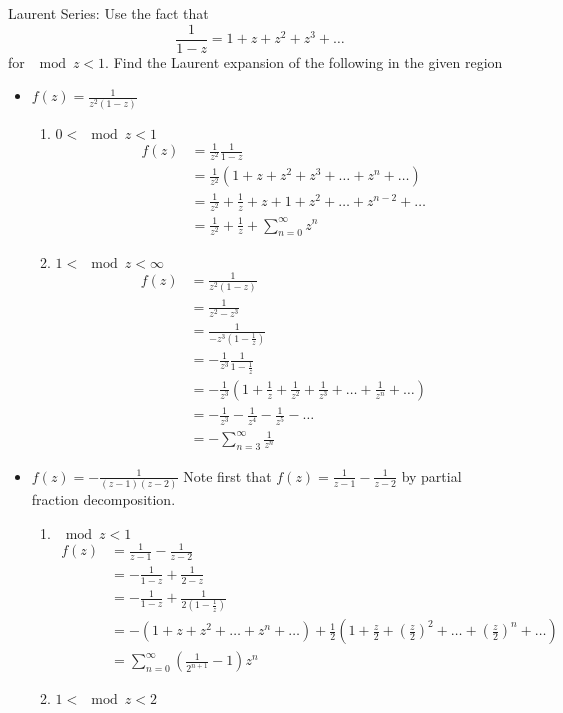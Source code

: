 \documentclass[12pt]{article}
\begin{document}
 Laurent Series: Use the fact that $$ \frac{1}{1-z} = 1 + z + z^2 + z^3 + \dots $$ for $\mod{z} < 1$. Find the Laurent expansion of the following in the given region \begin{itemize} 
 \item $f(z) = \frac{1}{z^2(1-z)}$ \begin{enumerate} 
\item $0 < \mod{z} < 1$
$$ \begin{aligned} f(z) &= \frac{1}{z^2}\frac{1}{1-z} \\ &= \frac{1}{z^2}(1 + z + z^2 + z^3 + \dots + z^n + \dots) \\ &= \frac{1}{z^2} + \frac{1}{z} + z + 1 + z^2 + \dots + z^{n-2} + \dots \\ &= \frac{1}{z^2} + \frac{1}{z} + \sum_{n=0}^\infty z^n \end{aligned} $$ 
\item $1 < \mod{z} < \infty$ 
$$ \begin{aligned} f(z) &= \frac{1}{z^2(1-z)} \\ &= \frac{1}{z^2 - z^3} \\ &= \frac{1}{-z^3(1 - \frac{1}{z})} \\ &= -\frac{1}{z^3}\frac{1}{1-\frac{1}{z}} \\ &= -\frac{1}{z^3}(1 + \frac{1}{z} + \frac{1}{z^2} + \frac{1}{z^3} + \dots + \frac{1}{z^n} + \dots) \\ &= -\frac{1}{z^3} - \frac{1}{z^4} - \frac{1}{z^5} - \dots \\ &= -\sum_{n=3}^\infty \frac{1}{z^n} \end{aligned} $$ 
 \end{enumerate} 
 \item $f(z) = -\frac{1}{(z-1)(z-2)}$ Note first that $f(z) = \frac{1}{z-1} - \frac{1}{z-2}$ by partial fraction decomposition. \begin{enumerate}
\item $\mod{z}<1$ 
$$ \begin{aligned} f(z) &= \frac{1}{z-1} - \frac{1}{z-2} \\ &= -\frac{1}{1-z} + \frac{1}{2-z} \\ &= -\frac{1}{1-z} + \frac{1}{2(1 - \frac{1}{z})} \\ &= -(1 + z + z^2  + \dots + z^n + \dots ) + \frac{1}{2}(1 + \frac{z}{2} + (\frac{z}{2})^2 + \dots + (\frac{z}{2})^n + \dots) \\ &= \sum_{n=0}^\infty (\frac{1}{2^{n+1}} - 1)z^n \end{aligned} $$ 
\item $1< \mod{z} < 2$

\end{enumerate}
\end{itemize}
\end{document}
